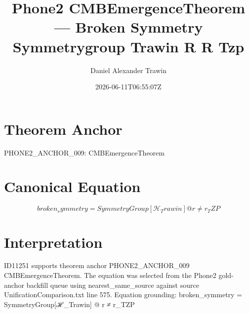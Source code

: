\documentclass[11pt]{article}
\title{Phone2 CMBEmergenceTheorem — Broken Symmetry Symmetrygroup Trawin R R Tzp}
\author{Daniel Alexander Trawin}
\date{2026-06-11T06:55:07Z}
\begin{document}
\maketitle
\section*{Theorem Anchor}
PHONE2_ANCHOR_009: CMBEmergenceTheorem
\section*{Canonical Equation}
\[
broken_symmetry = SymmetryGroup[ℋ_Trawin] @ r ≠ r_TZP
\]
\section*{Interpretation}
ID11251 supports theorem anchor PHONE2_ANCHOR_009 CMBEmergenceTheorem. The equation was selected from the Phone2 gold-anchor backfill queue using nearest_same_source against source UnificationComparison.txt line 575. Equation grounding: broken_symmetry = SymmetryGroup[ℋ_Trawin] @ r ≠ r_TZP
\end{document}
